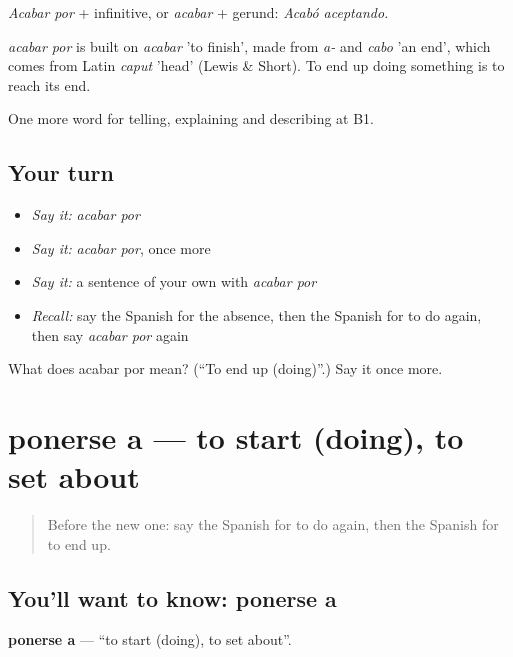 \emph{Acabar por} + infinitive, or \emph{acabar} + gerund: \emph{Acabó aceptando.}

\begin{cousinweb}
\emph{acabar por} is built on \emph{acabar} 'to finish', made from \emph{a-} and \emph{cabo} 'an end', which comes from Latin \emph{caput} 'head' (Lewis \& Short). To end up doing something is to reach its end.
\end{cousinweb}

\begin{grammarlens}[title={What you've built}]
One more word for telling, explaining and describing at B1.
\end{grammarlens}

\subsection*{Your turn}
\begin{itemize}
\raggedright
  \item \emph{Say it:} \emph{acabar por}
  \item \emph{Say it:} \emph{acabar por}, once more
  \item \emph{Say it:} a sentence of your own with \emph{acabar por}
  \item \emph{Recall:} say the Spanish for the absence, then the Spanish for to do again, then say \emph{acabar por} again
\end{itemize}

\begin{tcolorbox}[breakable,colback=teal!4,colframe=teal!35!black,title={Before you move on}]
What does acabar por mean? (\textquotedblleft{}To end up (doing)\textquotedblright{}.) Say it once more.
\end{tcolorbox}
\section[ponerse a]{ponerse a — to start (doing), to set about}

\label{lesson:ES-C562-ponerse-a}



\begin{quote}
Before the new one: say the Spanish for to do again, then the Spanish for to end up.
\end{quote}

\subsection*{You'll want to know: ponerse a}
\textbf{ponerse a} — \textquotedblleft{}to start (doing), to set about\textquotedblright{}.

